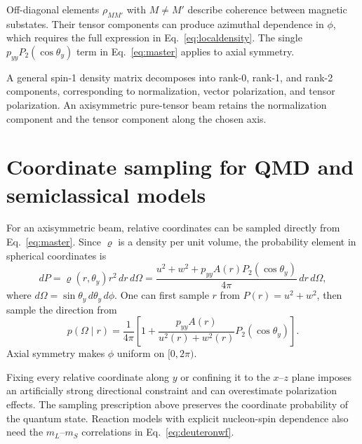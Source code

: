 \documentclass[11pt,a4paper]{article}
\begin{document}
Off-diagonal elements $\rho_{MM'}$ with $M\ne M'$ describe coherence
between magnetic substates. Their tensor components can produce
azimuthal dependence in $\phi$, which requires the full expression in
Eq.~\eqref{eq:localdensity}. The single $p_{yy}P_2(\cos\theta_y)$ term in
Eq.~\eqref{eq:master} applies to axial symmetry.

A general spin-1 density matrix decomposes into rank-0, rank-1, and
rank-2 components, corresponding to normalization, vector polarization,
and tensor polarization. An axisymmetric pure-tensor beam retains the
normalization component and the tensor component along the chosen axis.

\clearpage
\section{Coordinate sampling for QMD and semiclassical models}

For an axisymmetric beam, relative coordinates can be sampled directly
from Eq.~\eqref{eq:master}. Since $\varrho$ is a density per unit volume,
the probability element in spherical coordinates is
\begin{equation}
 dP=\varrho(r,\theta_y)r^2\,dr\,d\Omega
 =\frac{u^2+w^2+p_{yy}A(r)P_2(\cos\theta_y)}{4\pi}\,dr\,d\Omega,
\label{eq:sampling}
\end{equation}
where $d\Omega=\sin\theta_y\,d\theta_y\,d\phi$.
One can first sample $r$ from $P(r)=u^2+w^2$, then sample the direction from
\[
p(\Omega\mid r)=\frac{1}{4\pi}
\left[1+\frac{p_{yy}A(r)}{u^2(r)+w^2(r)}P_2(\cos\theta_y)\right].
\]
Axial symmetry makes $\phi$ uniform on $[0,2\pi)$.

Fixing every relative coordinate along $y$ or confining it to the
$x$--$z$ plane imposes an artificially strong directional constraint
and can overestimate polarization effects. The sampling prescription
above preserves the coordinate probability of the quantum state.
Reaction models with explicit nucleon-spin dependence also need the
$m_L$--$m_S$ correlations in Eq.~\eqref{eq:deuteronwf}.
\end{document}
